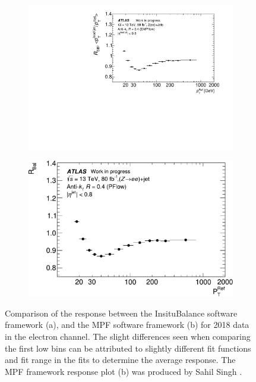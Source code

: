 \begin{figure}[t]
\centering
\begin{subfigure}[b]{\textwidth}
    \centering
    \includegraphics[width=1.05\textwidth]{plots/insitu/SmallRresponse_logX_WIP.pdf}
    \caption{\vspace{20pt}\label{fig:insitu:crosscheck:a}}
\end{subfigure}
\hfill
\begin{subfigure}[b]{\textwidth}
    \centering
    \includegraphics[width=\textwidth]{plots/insitu/MPF_framework_RDB_WIP.pdf}
    \caption{\label{fig:insitu:crosscheck:b}}
\end{subfigure}
\caption{Comparison of the \rdb response between the InsituBalance software framework (a), and the MPF software framework (b) for 2018 data in the electron channel. The slight differences seen when comparing the first low \pt bins can be attributed to slightly different fit functions and fit range in the fits to determine the average response. The MPF framework response plot (b) was produced by Sahil Singh \cite{Insitu:sahilresponse}.\label{fig:insitu:crosscheck}}
\end{figure}


